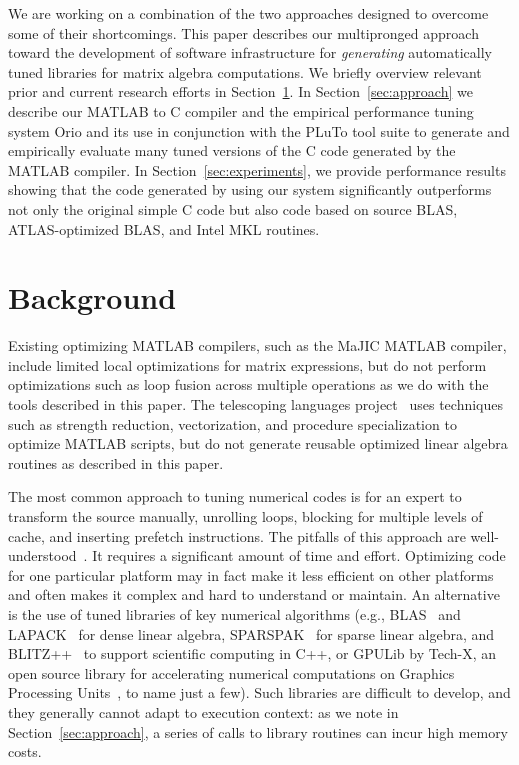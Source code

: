 \documentclass[runningheads]{llncs}
\begin{document}
We are working on a combination of the two approaches designed to overcome some of their shortcomings.   This paper describes our multipronged approach toward the development of software infrastructure for \emph{generating} automatically tuned libraries for matrix algebra computations.  We briefly overview relevant prior and current research efforts in Section~\ref{sec:background}. In Section~\ref{sec:approach} we describe our MATLAB to C compiler and the empirical performance tuning system Orio and its use in conjunction with the PLuTo tool suite to generate and empirically evaluate many tuned versions of the C code generated by the MATLAB compiler.  In Section~\ref{sec:experiments}, we provide performance results showing that the code generated by using our system significantly outperforms not only the original simple C code but also code based on source BLAS, ATLAS-optimized BLAS, and Intel MKL routines.

\section{Background}
\label{sec:background}

Existing optimizing MATLAB compilers, such as the MaJIC MATLAB compiler, include limited local optimizations for matrix expressions, but do not perform optimizations such as loop fusion across multiple operations as we do with the tools described in this paper. The telescoping languages project~\cite{telescopingurl,teleoverview,Ken99} uses techniques such as strength reduction, vectorization, and procedure specialization to optimize MATLAB scripts, but do not generate reusable optimized linear algebra routines as described in this paper.

The most common approach  to tuning numerical codes is for an expert to transform the source manually, unrolling loops, blocking for multiple levels of cache, and inserting prefetch instructions.  The pitfalls of this approach are well-understood~\cite{Goedecker01}.  It requires a significant amount of time and effort. Optimizing code for one particular platform may in fact make it less efficient on other platforms and often makes it complex and hard to understand or maintain.    An alternative is the use of tuned libraries of key numerical algorithms (e.g., BLAS~\cite{Dongarra:1990fk} and LAPACK~\cite{LAPACK} for dense linear algebra, SPARSPAK~\cite{sparspak} for sparse linear algebra, and BLITZ++~\cite{blitz} to support scientific computing in C++, or GPULib by Tech-X, an open source library for accelerating numerical computations on Graphics Processing Units~\cite{gpulib}, to name just a few). Such libraries are difficult to develop, and they generally cannot adapt to execution context: as we note in Section~\ref{sec:approach}, a series of calls to library routines can incur high memory costs.
\end{document}
